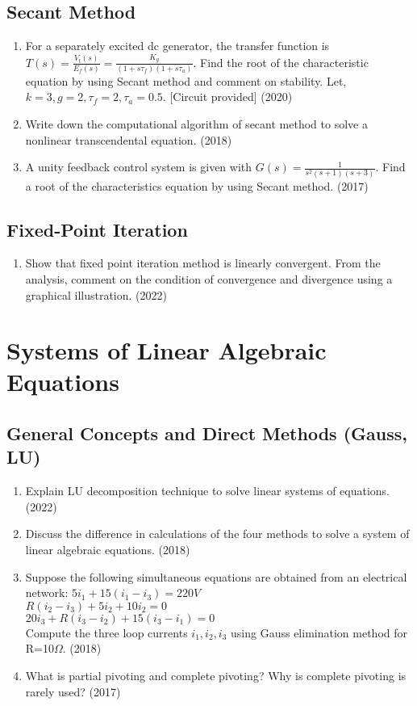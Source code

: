 \documentclass[12pt, a4paper]{article}
\begin{document}
	\subsection{Secant Method}
	\begin{enumerate}
		\item For a separately excited dc generator, the transfer function is $T(s) = \frac{V_t(s)}{E_f(s)} = \frac{K_g}{(1+s\tau_f)(1+s\tau_a)}$. Find the root of the characteristic equation by using Secant method and comment on stability. Let, $k=3, g=2, \tau_f=2, \tau_a=0.5$. [Circuit provided] (2020)
		\item Write down the computational algorithm of secant method to solve a nonlinear transcendental equation. (2018)
		\item A unity feedback control system is given with $G(s) = \frac{1}{s^2(s+1)(s+3)}$. Find a root of the characteristics equation by using Secant method. (2017)
	\end{enumerate}
	
	\subsection{Fixed-Point Iteration}
	\begin{enumerate}
		\item Show that fixed point iteration method is linearly convergent. From the analysis, comment on the condition of convergence and divergence using a graphical illustration. (2022)
	\end{enumerate}
	
	
	\section{Systems of Linear Algebraic Equations}
	
	\subsection{General Concepts and Direct Methods (Gauss, LU)}
	\begin{enumerate}
		\item Explain LU decomposition technique to solve linear systems of equations. (2022)
		\item Discuss the difference in calculations of the four methods to solve a system of linear algebraic equations. (2018)
		\item Suppose the following simultaneous equations are obtained from an electrical network:
		$5i_1 + 15(i_1-i_3) = 220V$ \\
		$R(i_2-i_3) + 5i_2 + 10i_2 = 0$ \\
		$20i_3 + R(i_3-i_2) + 15(i_3-i_1) = 0$ \\
		Compute the three loop currents $i_1, i_2, i_3$ using Gauss elimination method for R=10$\Omega$. (2018)
		\item What is partial pivoting and complete pivoting? Why is complete pivoting is rarely used? (2017)
	\end{enumerate}
	
\end{document}
